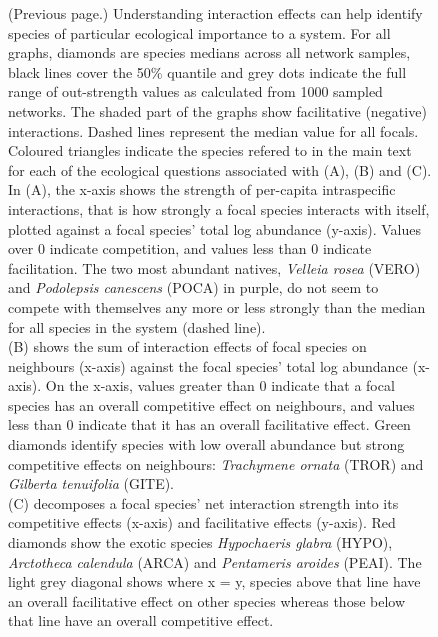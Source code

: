 \documentclass[a4,12pt]{article}
\begin{document}
    \addtocounter{figure}{-1}
    \begin{figure} [t!]
        \caption{(Previous page.) Understanding interaction effects can help identify species of particular ecological importance to a system. For all graphs, diamonds are species medians across all network samples, black lines cover the 50\% quantile and grey dots indicate the full range of out-strength values as calculated from 1000 sampled networks. The shaded part of the graphs show facilitative (negative) interactions. Dashed lines represent the median value for all focals. Coloured triangles indicate the species refered to in the main text for each of the ecological questions associated with (A), (B) and (C). \\
        In (A), the x-axis shows the strength of per-capita intraspecific interactions, that is how strongly a focal species interacts with itself, plotted against a focal species' total log abundance (y-axis). Values over $0$ indicate competition, and values less than $0$ indicate facilitation.  The two most abundant natives, \textit{Velleia rosea} (VERO) and \textit{Podolepsis canescens} (POCA) in purple, do not seem to compete with themselves any more or less strongly than the median for all species in the system (dashed line). \\
        (B) shows the sum of interaction effects of focal species on neighbours (x-axis) against the focal species' total log abundance (x-axis). On the x-axis, values greater than $0$ indicate that a focal species has an overall competitive effect on neighbours, and values less than $0$ indicate that it has an overall facilitative effect. Green diamonds identify species with low overall abundance but strong competitive effects on neighbours: \textit{Trachymene ornata} (TROR) and \textit{Gilberta tenuifolia} (GITE). \\
        (C) decomposes a focal species' net interaction strength into its competitive effects (x-axis) and facilitative effects (y-axis). Red diamonds show the exotic species \textit{Hypochaeris glabra} (HYPO), \textit{Arctotheca calendula} (ARCA) and \textit{Pentameris aroides} (PEAI). The light grey diagonal shows where x = y, species above that line have an overall facilitative effect on other species whereas those below that line have an overall competitive effect.} 
    \end{figure}

\clearpage
\newpage
\end{document}
